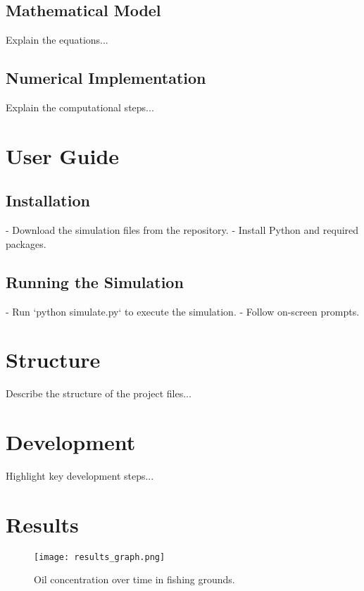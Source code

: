 \documentclass{article}
\begin{document}
\subsection{Mathematical Model}
Explain the equations...
\subsection{Numerical Implementation}
Explain the computational steps...

\section{User Guide}
\subsection{Installation}
- Download the simulation files from the repository.
- Install Python and required packages.
\subsection{Running the Simulation}
- Run `python simulate.py` to execute the simulation.
- Follow on-screen prompts.

\section{Structure}
Describe the structure of the project files...

\section{Development}
Highlight key development steps...

\section{Results}
\begin{figure}[h!]
\centering
\texttt{[image: results\_graph.png]}
\caption{Oil concentration over time in fishing grounds.}
\label{fig:results}
\end{figure}
\end{document}
